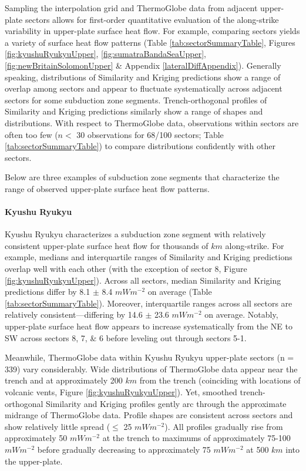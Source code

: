 Sampling the interpolation grid and ThermoGlobe data from adjacent upper-plate sectors allows for first-order quantitative evaluation of the along-strike variability in upper-plate surface heat flow. For example, comparing sectors yields a variety of surface heat flow patterns (Table \ref{tab:sectorSummaryTable}, Figures \ref{fig:kyushuRyukyuUpper}, \ref{fig:sumatraBandaSeaUpper}, \ref{fig:newBritainSolomonUpper} \& Appendix \ref{lateralDiffAppendix}). Generally speaking, distributions of Similarity and Kriging predictions show a range of overlap among sectors and appear to fluctuate systematically across adjacent sectors for some subduction zone segments. Trench-orthogonal profiles of Similarity and Kriging predictions similarly show a range of shapes and distributions. With respect to ThermoGlobe data, observations within sectors are often too few (\(n <\) 30 observations for 68/100 sectors; Table \ref{tab:sectorSummaryTable}) to compare distributions confidently with other sectors.

Below are three examples of subduction zone segments that characterize the range of observed upper-plate surface heat flow patterns.

\hypertarget{kyushu-ryukyu-1}{%
\paragraph{Kyushu Ryukyu}\label{kyushu-ryukyu-1}}

Kyushu Ryukyu characterizes a subduction zone segment with relatively consistent upper-plate surface heat flow for thousands of \(km\) along-strike. For example, medians and interquartile ranges of Similarity and Kriging predictions overlap well with each other (with the exception of sector 8, Figure \ref{fig:kyushuRyukyuUpper}). Across all sectors, median Similarity and Kriging predictions differ by 8.1 \(\pm\) 8.4 \(mWm^{-2}\) on average (Table \ref{tab:sectorSummaryTable}). Moreover, interquartile ranges across all sectors are relatively consistent---differing by 14.6 \(\pm\) 23.6 \(mWm^{-2}\) on average. Notably, upper-plate surface heat flow appears to increase systematically from the NE to SW across sectors 8, 7, \& 6 before leveling out through sectors 5-1.

Meanwhile, ThermoGlobe data within Kyushu Ryukyu upper-plate sectors (n = 339) vary considerably. Wide distributions of ThermoGlobe data appear near the trench and at approximately 200 \(km\) from the trench (coinciding with locations of volcanic vents, Figure \ref{fig:kyushuRyukyuUpper}). Yet, smoothed trench-orthogonal Similarity and Kriging profiles gently arc through the approximate midrange of ThermoGlobe data. Profile shapes are consistent across sectors and show relatively little spread (\(\leq\) 25 \(mWm^{-2}\)). All profiles gradually rise from approximately 50 \(mWm^{-2}\) at the trench to maximums of approximately 75-100 \(mWm^{-2}\) before gradually decreasing to approximately 75 \(mWm^{-2}\) at 500 \(km\) into the upper-plate.



